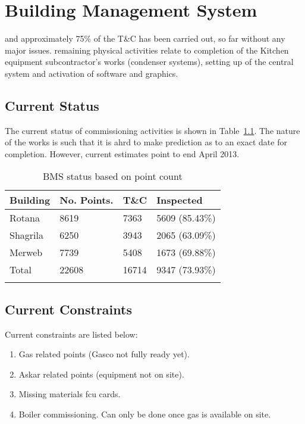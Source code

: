 \chapter{Building Management System}
\label{bms}

 and approximately 75\% of the T\&C has been carried out, so far without any major issues. remaining physical activities relate
to completion of the Kitchen equipment subcontractor's works (condenser systems), setting up of the central system and activation of software and
graphics.

\section{Current Status}
The current status of commissioning activities is shown in
Table~\ref{tbl:bmsstatus}. The nature of the works is such
that it is ahrd to make prediction as to an exact date
for completion. However, current estimates point to 
end April 2013.
\begin{table}[htbp]
\begin{tabular}{llll}
\toprule
Building   &No. Points. &T\&C &Inspected\\
\midrule
Rotana     & 8619       &7363     & 5609 (85.43\%) \\
Shagrila   & 6250       &3943     & 2065 (63.09\%) \\
Merweb     & 7739       &5408     & 1673 (69.88\%) \\
\midrule
Total      &22608       &16714    &9347  (73.93\%) \\
\bottomrule 
\caption{BMS status based on point count}
\label{tbl:bmsstatus}
\end{tabular}
\end{table}

\section{Current Constraints} 

Current constraints are listed below:

\begin{enumerate}
\item Gas related points (Gasco not fully ready yet).
\item Askar related points (equipment not on site).
\item Missing materials fcu cards.
\item Boiler commissioning. Can only be done once gas is available on
      site.
\end{enumerate}